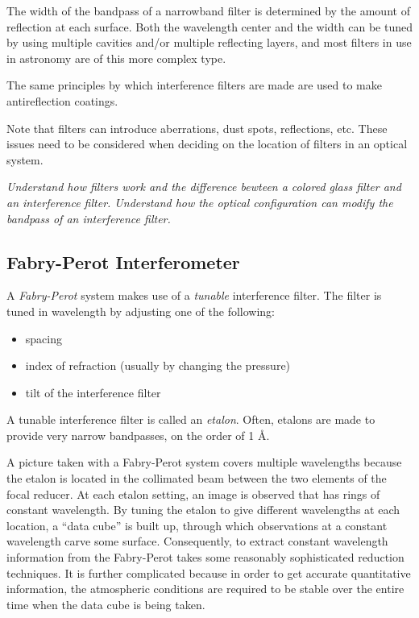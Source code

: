 \documentclass[12pt]{article}
\newcommand{\test}[1]{%
    \begin{center}
        {\parbox{0.9\textwidth}{\textit{\small#1}}}
    \end{center}}
\begin{document}
The width of the bandpass of a narrowband filter is determined by the amount of
reflection at each surface. Both the wavelength center and the width can be
tuned by using multiple cavities and/or multiple reflecting layers, and most
filters in use in astronomy are of this more complex type.

The same principles by which interference filters are made are used to
make antireflection coatings.

Note that filters can introduce aberrations, dust spots, reflections, etc.
These issues need to be considered when deciding on the location of filters in
an optical system.

\test{Understand how filters work and the difference bewteen a colored glass
filter and an interference filter. Understand how the optical configuration
can modify the bandpass of an interference filter.}

\subsection{Fabry-Perot Interferometer}
A \textit{Fabry-Perot} system makes use of a \textit{tunable} interference
filter. The filter is tuned in wavelength by adjusting one of the following:
\begin{itemize}
    \item spacing
    \item index of refraction (usually by changing the pressure)
    \item tilt of the interference filter
\end{itemize}
A tunable interference filter is called an \textit{etalon}. Often, etalons are
made to provide very narrow bandpasses, on the order of 1 \AA{}.

A picture taken with a Fabry-Perot system covers multiple wavelengths because
the etalon is located in the collimated beam between the two elements of the
focal reducer. At each etalon setting, an image is observed that has rings of
constant wavelength. By tuning the etalon to give different wavelengths at each
location, a ``data cube'' is built up, through which observations at a constant
wavelength carve some surface. Consequently, to extract constant wavelength
information from the Fabry-Perot takes some reasonably sophisticated reduction
techniques. It is further complicated because in order to get accurate
quantitative information, the atmospheric conditions are required to be stable
over the entire time when the data cube is being taken.
\end{document}
